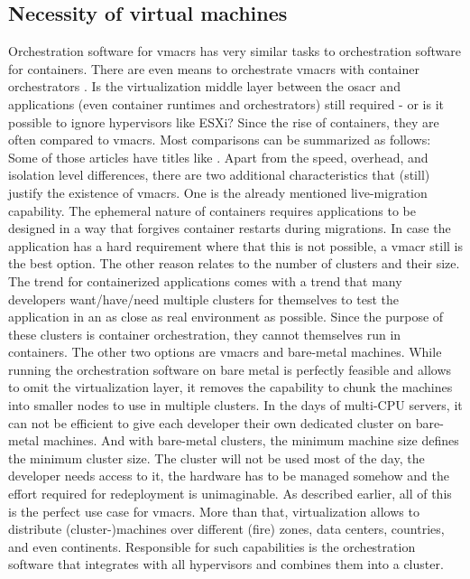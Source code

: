 \subsection{Necessity of virtual machines}
Orchestration software for \gls{vmacr}s has very similar tasks to orchestration software for containers. There are even means to orchestrate \gls{vmacr}s with container orchestrators \cite{kubevirt}. Is the virtualization middle layer between the \gls{osacr} and applications (even container runtimes and orchestrators) still required - or is it possible to ignore  hypervisors like ESXi?
\newline
Since the rise of containers, they are often compared to \gls{vmacr}s. Most comparisons can be summarized as follows: 
\newline
Some of those articles have titles like  \cite{vms_dead} \cite{vms_dead_not_fast}. Apart from the speed, overhead, and isolation level differences, there are two additional characteristics that (still) justify the existence of \gls{vmacr}s. One is the already mentioned live-migration capability. The ephemeral nature of containers requires applications to be designed in a way that forgives container restarts during migrations. In case the application has a hard requirement where that this is not possible, a \gls{vmacr} still is the best option. The other reason relates to the number of clusters and their size. The trend for containerized applications comes with a trend that many developers want/have/need multiple clusters for themselves to test the application in an as close as real environment as possible. Since the purpose of these clusters is container orchestration, they cannot themselves run in containers. The other two options are \gls{vmacr}s and bare-metal machines. While running the orchestration software on bare metal is perfectly feasible and allows to omit the virtualization layer, it removes the capability to chunk the machines into smaller nodes to use in multiple clusters. In the days of multi-CPU servers, it can not be efficient to give each developer their own dedicated cluster on bare-metal machines. And with bare-metal clusters, the minimum machine size defines the minimum cluster size. The cluster will not be used most of the day, the developer needs access to it, the hardware has to be managed somehow and the effort required for redeployment is unimaginable. As described earlier, all of this is the perfect use case for \gls{vmacr}s. More than that, virtualization allows to distribute (cluster-)machines over different (fire) zones, data centers, countries, and even continents. Responsible for such capabilities is the orchestration software that integrates with all hypervisors and combines them into a cluster.
